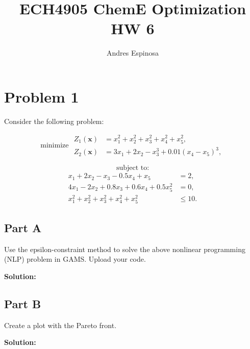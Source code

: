 \documentclass[11pt]{article}
\title{ECH4905 ChemE Optimization HW 6}
\author{Andres Espinosa}
\begin{document}
\maketitle

\section{Problem 1}
Consider the following problem:

\[
\text{minimize } 
\begin{aligned}
    Z_1(\mathbf{x}) &= x_1^2 + x_2^2 + x_3^2 + x_4^2 + x_5^2, \\
    Z_2(\mathbf{x}) &= 3x_1 + 2x_2 - x_3^3 + 0.01(x_4 - x_5)^3,
\end{aligned}
\]

\[
\text{subject to:}
\]
\[
\begin{aligned}
    x_1 + 2x_2 - x_3 - 0.5x_4 + x_5 &= 2, \\
    4x_1 - 2x_2 + 0.8x_3 + 0.6x_4 + 0.5x_5^2 &= 0, \\
    x_1^2 + x_2^2 + x_3^2 + x_4^2 + x_5^2 &\leq 10.
\end{aligned}
\]

\subsection{Part A}
Use the epsilon-constraint method to solve the above nonlinear programming (NLP) problem in GAMS. Upload your code.

\textbf{Solution:}

\subsection{Part B}
Create a plot with the Pareto front.

\textbf{Solution:} 
\end{document}
